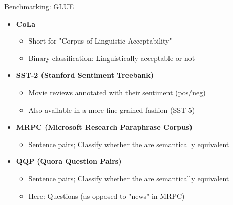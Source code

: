 \begin{vbframe}{Benchmarking: GLUE}

\vfill

\begin{itemize}
	\item \textbf{CoLa}
	\begin{itemize}
		\item Short for "Corpus of Linguistic Acceptability"
		\item Binary classification: Linguistically acceptable or not
	\end{itemize}
	\item \textbf{SST-2 (Stanford Sentiment Treebank)} 
	\begin{itemize}
		\item Movie reviews annotated with their sentiment (pos/neg)
		\item Also available in a more fine-grained fashion (SST-5)
	\end{itemize}
	\item \textbf{MRPC (Microsoft Research Paraphrase Corpus)}
	\begin{itemize}
		\item Sentence pairs; Classify whether the are semantically equivalent
	\end{itemize}
	\item \textbf{QQP (Quora Question Pairs)} 
	\begin{itemize}
		\item Sentence pairs; Classify whether the are semantically equivalent
		\item Here: Questions (as opposed to "news" in MRPC)
	\end{itemize}
\end{itemize}

\vfill

\end{vbframe}


